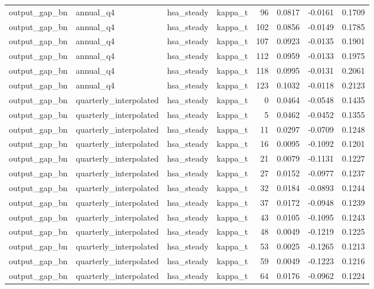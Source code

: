 \begin{tabular}{llllrrrr}
output\_gap\_bn & annual\_q4 & hsa\_steady & kappa\_t & 96 & 0.0817 & -0.0161 & 0.1709 \\
output\_gap\_bn & annual\_q4 & hsa\_steady & kappa\_t & 102 & 0.0856 & -0.0149 & 0.1785 \\
output\_gap\_bn & annual\_q4 & hsa\_steady & kappa\_t & 107 & 0.0923 & -0.0135 & 0.1901 \\
output\_gap\_bn & annual\_q4 & hsa\_steady & kappa\_t & 112 & 0.0959 & -0.0133 & 0.1975 \\
output\_gap\_bn & annual\_q4 & hsa\_steady & kappa\_t & 118 & 0.0995 & -0.0131 & 0.2061 \\
output\_gap\_bn & annual\_q4 & hsa\_steady & kappa\_t & 123 & 0.1032 & -0.0118 & 0.2123 \\
output\_gap\_bn & quarterly\_interpolated & hsa\_steady & kappa\_t & 0 & 0.0464 & -0.0548 & 0.1435 \\
output\_gap\_bn & quarterly\_interpolated & hsa\_steady & kappa\_t & 5 & 0.0462 & -0.0452 & 0.1355 \\
output\_gap\_bn & quarterly\_interpolated & hsa\_steady & kappa\_t & 11 & 0.0297 & -0.0709 & 0.1248 \\
output\_gap\_bn & quarterly\_interpolated & hsa\_steady & kappa\_t & 16 & 0.0095 & -0.1092 & 0.1201 \\
output\_gap\_bn & quarterly\_interpolated & hsa\_steady & kappa\_t & 21 & 0.0079 & -0.1131 & 0.1227 \\
output\_gap\_bn & quarterly\_interpolated & hsa\_steady & kappa\_t & 27 & 0.0152 & -0.0977 & 0.1237 \\
output\_gap\_bn & quarterly\_interpolated & hsa\_steady & kappa\_t & 32 & 0.0184 & -0.0893 & 0.1244 \\
output\_gap\_bn & quarterly\_interpolated & hsa\_steady & kappa\_t & 37 & 0.0172 & -0.0948 & 0.1239 \\
output\_gap\_bn & quarterly\_interpolated & hsa\_steady & kappa\_t & 43 & 0.0105 & -0.1095 & 0.1243 \\
output\_gap\_bn & quarterly\_interpolated & hsa\_steady & kappa\_t & 48 & 0.0049 & -0.1219 & 0.1225 \\
output\_gap\_bn & quarterly\_interpolated & hsa\_steady & kappa\_t & 53 & 0.0025 & -0.1265 & 0.1213 \\
output\_gap\_bn & quarterly\_interpolated & hsa\_steady & kappa\_t & 59 & 0.0049 & -0.1223 & 0.1216 \\
output\_gap\_bn & quarterly\_interpolated & hsa\_steady & kappa\_t & 64 & 0.0176 & -0.0962 & 0.1224 \\

\end{tabular}
